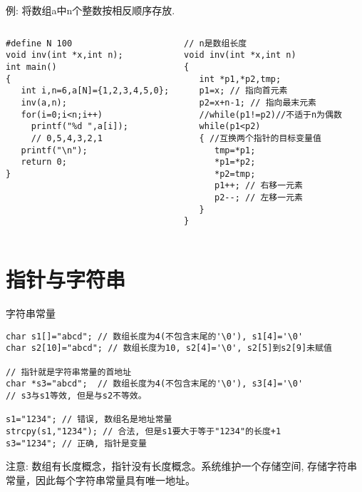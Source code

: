 \begin{frame}{例: 将数组a中n个整数按相反顺序存放. }
\vspace{-0.5cm}
\begin{columns}[T]
\begin{lstlisting}
#define N 100
void inv(int *x,int n);
int main()
{
   int i,n=6,a[N]={1,2,3,4,5,0};
   inv(a,n);
   for(i=0;i<n;i++) 
     printf("%d ",a[i]); 
     // 0,5,4,3,2,1
   printf("\n");
   return 0;
}
\end{lstlisting}
\begin{lstlisting}[frame=leftline]
// n是数组长度
void inv(int *x,int n)
{
   int *p1,*p2,tmp;
   p1=x; // 指向首元素
   p2=x+n-1; // 指向最末元素
   //while(p1!=p2)//不适于n为偶数
   while(p1<p2)
   { //互换两个指针的目标变量值
      tmp=*p1;
      *p1=*p2;
      *p2=tmp;
      p1++; // 右移一元素
      p2--; // 左移一元素
   }
}
\end{lstlisting}
\end{columns}
\medskip
\end{frame}

\section{指针与字符串}

\begin{frame}{字符串常量}
\begin{lstlisting}
char s1[]="abcd"; // 数组长度为4(不包含末尾的'\0'), s1[4]='\0' 
char s2[10]="abcd"; // 数组长度为10, s2[4]='\0', s2[5]到s2[9]未赋值

// 指针就是字符串常量的首地址
char *s3="abcd";  // 数组长度为4(不包含末尾的'\0'), s3[4]='\0' 
// s3与s1等效, 但是与s2不等效。 

s1="1234"; // 错误, 数组名是地址常量
strcpy(s1,"1234"); // 合法, 但是s1要大于等于"1234"的长度+1
s3="1234"; // 正确, 指针是变量
\end{lstlisting}
\begin{block}{注意: }
	数组有长度概念，指针没有长度概念。系统维护一个存储空间, 存储字符串常量，因此每个字符串常量具有唯一地址。
\end{block}
\end{frame}


